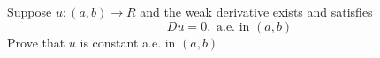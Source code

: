 Suppose $u: (a, b) \rightarrow R$ and the weak derivative exists and satisfies
$$
Du = 0, \text{ a.e. in } (a, b)
$$
Prove that $u$ is constant a.e. in $(a, b)$
